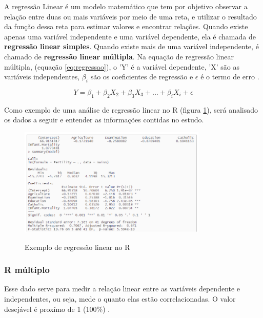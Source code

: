 A regressão Linear é um modelo matemático que tem por objetivo observar a relação entre duas ou mais variáveis por meio de uma reta, e utilizar o resultado da função dessa reta para estimar valores e encontrar relações. Quando existe apenas uma variável independente e uma variável dependente, ela é chamada de \textbf{regressão linear simples}. Quando existe mais de uma variável independente, é chamado de \textbf{regressão linear múltipla}. Na equação de regressão linear múltipla, (equação \ref*{eq:regressao}), o 'Y' é a variável dependente, 'X' são as variáveis independentes, $\beta_i$ são os coeficientes de regressão e $\epsilon$ é o termo de erro \cite{5}. 

\begin{equation}
    Y = \beta_1 + \beta_2X_2 + \beta_3X_3 + ... + \beta_iX_i + \epsilon  
    \label{eq:regressao}  
\end{equation}

Como exemplo de uma análise de regressão linear no R (figura \ref*{fig:R}), será analisado os dados a seguir e entender as informações contidas no estudo.
 
\begin{figure}[h]

    \caption{Exemplo de regressão linear no R \cite{5}}
    \centering
    \includegraphics[width=0.8\textwidth]{images/R.png}
    \label{fig:R}
    
\end{figure}

\subsubsection*{R múltiplo}

Esse dado serve para medir a relação linear entre as variáveis dependente e independentes, ou seja, mede o quanto elas estão correlacionadas. O valor desejável é proxímo de 1 (100\%) \cite{5}.

